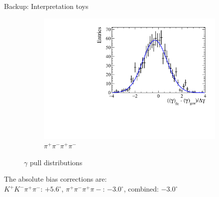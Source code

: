 \documentclass[xcolor={dvipsnames}]{beamer}
\begin{document}
\begin{frame}{Backup: Interpretation toys}
\begin{figure}
\begin{subfigure}{0.5\textwidth}
      \includegraphics[width=1.0\textwidth]{Plots/gamma_pull_toys_pipipipi.pdf}
      \vspace{-0.3cm}
      \caption*{$\pi^+\pi^-\pi^+\pi^-$}
    \end{subfigure}
    \vspace{-0.5cm}
    \caption*{$\gamma$ pull distributions}
  \end{figure}
  \vspace{-0.3cm}
  \begin{center}
    The absolute bias corrections are:\\
    $K^+K^-\pi^+\pi^-$: $+5.6^\circ$, $\pi^+\pi^-\pi^+\pi-$: $-3.0^\circ$, combined: $-3.0^\circ$
  \end{center}
\end{frame}
\end{document}
